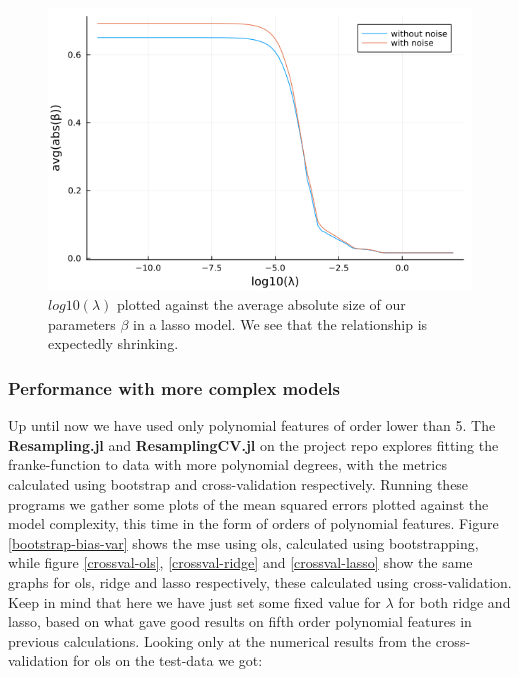 \documentclass{article}
\begin{document}
\begin{figure}
    \centerline{\includegraphics[scale=0.5]{lasso_beta_size}}
    \caption{$log10(\lambda)$ plotted against the average absolute size of our parameters $\beta$ in a lasso model. We see that the relationship is expectedly shrinking.}
    \label{Lasso-beta-sizes}
\end{figure}

\subsubsection{Performance with more complex models}
Up until now we have used only polynomial features of order lower than 5. The
\textbf{Resampling.jl} and \textbf{ResamplingCV.jl} on the project repo
\cite{githubrepoproject1} explores fitting the franke-function to data with more
polynomial degrees, with the metrics calculated using bootstrap and
cross-validation respectively. Running these programs we gather some plots of
the mean squared errors plotted against the model complexity, this time in the
form of orders of polynomial features. Figure \ref{bootstrap-bias-var} shows the
mse using ols, calculated using bootstrapping, while figure \ref{crossval-ols},
\ref{crossval-ridge} and \ref{crossval-lasso} show the same graphs for ols,
ridge and lasso respectively, these calculated using cross-validation. Keep in
mind that here we have just set some fixed value for $\lambda$ for both ridge
and lasso, based on what gave good results on fifth order polynomial features in
previous calculations. Looking only at the numerical results from the
cross-validation for ols on the test-data we got:

\begin{table}[htpb!]
\end{table}
\end{document}
